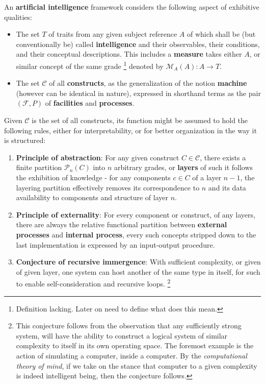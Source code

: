 \begin{conjecture}\label{conj:Artificial_FrameWork}
    An \textbf{artificial intelligence} framework considers the following aspect of exhibitive qualities:
    \begin{itemize}
        \item The set $T$ of traits from any given subject reference $A$ of which shall be (but conventionally be) called \textbf{intelligence} and their observables, their conditions, and their conceptual descriptions. This includes a \textbf{measure} takes either $A$, or similar concept of the same grade \footnote{Definition lacking. Later on need to define what does this mean.} denoted by $\mathcal{M}_{A}(A): A\to T$.
        \item The set $\mathcal{C}$ of all \textbf{constructs}, as the generalization of the notion \textbf{machine} (however can be identical in nature), expressed in shorthand terms as the pair $(\mathcal{F},P)$ of \textbf{facilities} and \textbf{processes}. 
    \end{itemize}
    Given $\mathcal{C}$ is the set of all constructs, its function might be assumed to hold the following rules, either for interpretability, or for better organization in the way it is structured: 
    \begin{enumerate}
        \item \textbf{Principle of abstraction}: For any given construct $C\in \mathcal{C}$, there exists a finite partition $\mathcal{P}_{n}(C)$ into $n$ arbitrary grades, or \textbf{layers} of such it follows the exhibition of knowledge - for any components $c\in C$ of a layer $n-1$, the layering partition effectively removes its correspondence to $n$ and its data availability to components and structure of layer $n$.
        \item \textbf{Principle of externality}: For every component or construct, of any layers, there are always the relative functional partition between \textbf{external processes} and \textbf{internal process}, every such concepts stripped down to the last implementation is expressed by an input-output procedure.  
        \item \textbf{Conjecture of recursive immergence}: With sufficient complexity, or given of given layer, one system can host another of the same type in itself, for such to enable self-consideration and recursive loops. \footnote{This conjecture follows from the observation that any sufficiently strong system, will have the ability to construct a logical system of similar complexity to itself in its own operating space. The foremost example is the action of simulating a computer, inside a computer. By the \textit{computational theory of mind}, if we take on the stance that computer to a given complexity is indeed intelligent being, then the conjecture follows.}

\end{enumerate}
\end{conjecture}
